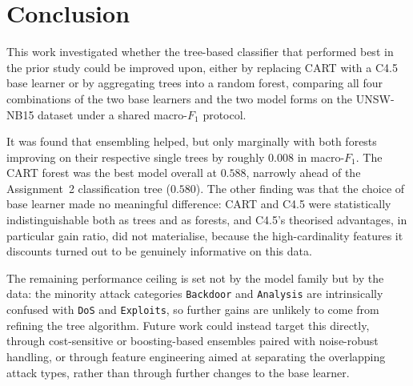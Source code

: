 \documentclass[conference]{IEEEtran}
\begin{document}
\section{Conclusion} %

This work investigated whether the tree-based classifier that performed best in the prior study
could be improved upon, either by replacing CART with a C4.5 base learner or by aggregating trees
into a random forest, comparing all four combinations of the two base learners and the two model
forms on the UNSW-NB15 dataset under a shared macro-$F_1$ protocol.

It was found that ensembling helped, but only marginally with both forests improving on
their respective single trees by roughly $0.008$ in macro-$F_1$.
The CART forest was the best model overall at $0.588$, narrowly ahead
of the Assignment~2 classification tree ($0.580$). The other finding was that the choice of base learner made no
meaningful difference: CART and C4.5 were statistically indistinguishable both as trees and as
forests, and C4.5's theorised advantages, in particular gain ratio, did not materialise, because
the high-cardinality features it discounts turned out to be genuinely informative on this data.

The remaining performance ceiling is set not by the model family but by the data: the minority
attack categories \texttt{Backdoor} and \texttt{Analysis} are intrinsically confused with
\texttt{DoS} and \texttt{Exploits}, so further gains are unlikely to come from refining the tree
algorithm. Future work could instead target this directly, through cost-sensitive or boosting-based
ensembles paired with noise-robust handling, or through feature engineering aimed at separating the
overlapping attack types, rather than through further changes to the base learner.

\nocite{ieeetemplate}


\end{document}
